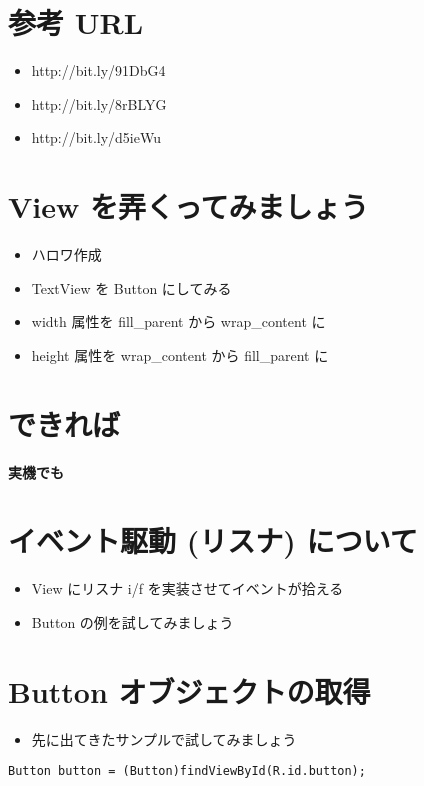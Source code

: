 \documentclass[slide,papersize]{jsarticle}
\begin{document}
\section*{参考 URL}
\bigskip
\begin{itemize}
\item http://bit.ly/91DbG4
\bigskip
\item http://bit.ly/8rBLYG
\bigskip
\item http://bit.ly/d5ieWu
\end{itemize}

\section*{View を弄くってみましょう}
\bigskip
\begin{itemize}
\item ハロワ作成
\bigskip
\item TextView を Button にしてみる
\bigskip
\item width 属性を fill\_parent から wrap\_content に
\bigskip
\item height 属性を wrap\_content から fill\_parent に
\end{itemize}

\section*{できれば}
\vspace*{17mm}
\begin{center}
{\Huge {\bf 実機でも}}
\end{center}

\section*{イベント駆動 (リスナ) について}
\bigskip
\begin{itemize}
\item {\footnotesize View にリスナ i/f を実装させてイベントが拾える}
\bigskip
\item {\footnotesize Button の例を試してみましょう}
\end{itemize}

\section*{Button オブジェクトの取得}
\medskip
\begin{itemize}
\item 先に出てきたサンプルで試してみましょう
\end{itemize}
\medskip
{\scriptsize
\begin{verbatim}
Button button = (Button)findViewById(R.id.button);
\end{verbatim}
}
\end{document}
